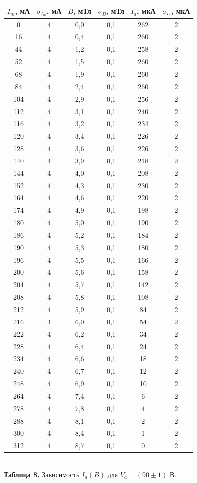 \documentclass[a4paper, 12pt]{article}%
\begin{document}
\begin{center}
\begin{tabular}{|c|c|c|c|c|c|}
\hline
$I_m$, мА & $\sigma_{I_m}$, мА & $B$, мТл & $\sigma_B$, мТл & $I_a$, мкА & $\sigma_{I_a}$, мкА \\ \hline
0 & 4 & 0,0 & 0,1 & 262 & 2 \\ \hline
16 & 4 & 0,4 & 0,1 & 260 & 2 \\ \hline
44 & 4 & 1,2 & 0,1 & 258 & 2 \\ \hline
52 & 4 & 1,5 & 0,1 & 260 & 2 \\ \hline
68 & 4 & 1,9 & 0,1 & 260 & 2 \\ \hline
84 & 4 & 2,4 & 0,1 & 260 & 2 \\ \hline
104 & 4 & 2,9 & 0,1 & 256 & 2 \\ \hline
112 & 4 & 3,1 & 0,1 & 240 & 2 \\ \hline
116 & 4 & 3,2 & 0,1 & 234 & 2 \\ \hline
120 & 4 & 3,4 & 0,1 & 226 & 2 \\ \hline
128 & 4 & 3,6 & 0,1 & 226 & 2 \\ \hline
140 & 4 & 3,9 & 0,1 & 218 & 2 \\ \hline
144 & 4 & 4,0 & 0,1 & 208 & 2 \\ \hline
152 & 4 & 4,3 & 0,1 & 230 & 2 \\ \hline
164 & 4 & 4,6 & 0,1 & 220 & 2 \\ \hline
174 & 4 & 4,9 & 0,1 & 198 & 2 \\ \hline
180 & 4 & 5,0 & 0,1 & 190 & 2 \\ \hline
186 & 4 & 5,2 & 0,1 & 184 & 2 \\ \hline
190 & 4 & 5,3 & 0,1 & 180 & 2 \\ \hline
196 & 4 & 5,5 & 0,1 & 166 & 2 \\ \hline
200 & 4 & 5,6 & 0,1 & 158 & 2 \\ \hline
204 & 4 & 5,7 & 0,1 & 142 & 2 \\ \hline
208 & 4 & 5,8 & 0,1 & 108 & 2 \\ \hline
212 & 4 & 5,9 & 0,1 & 84 & 2 \\ \hline
216 & 4 & 6,0 & 0,1 & 54 & 2 \\ \hline
222 & 4 & 6,2 & 0,1 & 34 & 2 \\ \hline
228 & 4 & 6,4 & 0,1 & 24 & 2 \\ \hline
234 & 4 & 6,6 & 0,1 & 18 & 2 \\ \hline
240 & 4 & 6,7 & 0,1 & 12 & 2 \\ \hline
248 & 4 & 6,9 & 0,1 & 10 & 2 \\ \hline
264 & 4 & 7,4 & 0,1 & 6 & 2 \\ \hline
278 & 4 & 7,8 & 0,1 & 4 & 2 \\ \hline
288 & 4 & 8,1 & 0,1 & 2 & 2 \\ \hline
300 & 4 & 8,4 & 0,1 & 1 & 2 \\ \hline
312 & 4 & 8,7 & 0,1 & 0 & 2 \\ \hline
\end{tabular}\\
\textbf{Таблица 8.} Зависимость $I_a(B)$ для $V_a = (90 \pm 1)$ В.
\end{center}
\end{document}
